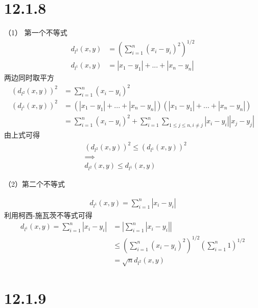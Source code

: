 \documentclass{article}
\begin{document}
\section*{12.1.8}
（1） 第一个不等式
\begin{align*}
      d_{l^2}(x, y) & = \left(\sum \limits_{i = 1}^n (x_i - y_i)^2\right)^{1/2} \\
      d_{l^1}(x, y) & = |x_1 - y_1| + ... + |x_n - y_n|
\end{align*}
两边同时取平方
\begin{align*}
      (d_{l^2}(x, y))^2 & = \sum \limits_{i = 1}^n (x_i - y_i)^2                                                      \\
      (d_{l^1}(x, y))^2 & = \left(|x_1 - y_1| + ... + |x_n - y_n|\right) \left(|x_1 - y_1| + ... + |x_n - y_n|\right) \\
                        & = \sum \limits_{i = 1}^n (x_i - y_i)^2
      + \sum \limits_{i=1}^n \sum \limits_{1 \leq j \leq n, i \neq j} |x_i - y_i||x_j - y_j|
\end{align*}
由上式可得
\begin{align*}
       & (d_{l^2}(x, y))^2 \leq (d_{l^1}(x, y))^2 \\
       & \implies                                 \\
       & d_{l^2}(x, y) \leq d_{l^1}(x, y)
\end{align*}

（2）第二个不等式

\begin{align*}
      d_{l^1}(x, y) = \sum \limits_{i = 1}^n |x_i - y_i|
\end{align*}
利用柯西-施瓦茨不等式可得
\begin{align*}
      d_{l^1}(x, y) = \sum \limits_{i = 1}^n |x_i - y_i| & = \left|\sum \limits_{i = 1}^n |x_i - y_i|\right|           \\
                                                         & \leq \left(\sum\limits_{i = 1}^n (x_i - y_i)^2\right)^{1/2}
      \left(\sum \limits_{i = 1}^n 1\right)^{1/2}                                                                      \\
                                                         & = \sqrt{n}d_{l^2}(x, y)
\end{align*}

\section*{12.1.9}
\end{document}
